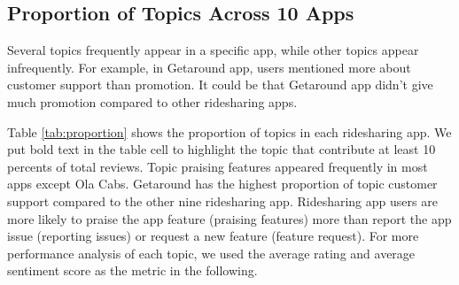 \documentclass[12pt]{article}
\begin{document}
\clearpage
\newpage
\subsection{Proportion of Topics Across 10 Apps}
Several topics frequently appear in a specific app, while other topics appear infrequently. For example, in Getaround app, users mentioned more about customer support than promotion. It could be that Getaround app didn’t give much promotion compared to other ridesharing apps.

Table \ref{tab:proportion} shows the proportion of topics in each ridesharing app. We put bold text in the table cell to highlight the topic that contribute at least 10 percents of total reviews. Topic praising features appeared frequently in most apps except Ola Cabs. Getaround has the highest proportion of topic customer support compared to the other nine ridesharing app. Ridesharing app users are more likely to praise the app feature (praising features) more than report the app issue (reporting issues) or request a new feature (feature request). For more performance analysis of each topic, we used the average rating and average sentiment score as the metric in the following.
\end{document}
